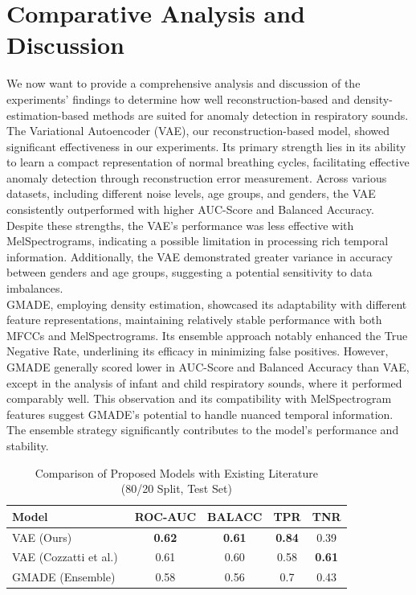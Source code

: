 \section{Comparative Analysis and Discussion}
We now want to provide a comprehensive analysis and discussion of the experiments' findings to determine how well reconstruction-based and density-estimation-based methods are suited for anomaly detection in respiratory sounds.
The Variational Autoencoder (VAE), our reconstruction-based model, showed significant effectiveness in our experiments. Its primary strength lies in its ability to learn a compact representation of normal breathing cycles, facilitating effective anomaly detection through reconstruction error measurement. Across various datasets, including different noise levels, age groups, and genders, the VAE consistently outperformed with higher AUC-Score and Balanced Accuracy.\\
Despite these strengths, the VAE's performance was less effective with MelSpectrograms, indicating a possible limitation in processing rich temporal information. Additionally, the VAE demonstrated greater variance in accuracy between genders and age groups, suggesting a potential sensitivity to data imbalances.\\
GMADE, employing density estimation, showcased its adaptability with different feature representations, maintaining relatively stable performance with both MFCCs and MelSpectrograms. Its ensemble approach notably enhanced the True Negative Rate, underlining its efficacy in minimizing false positives. However, GMADE generally scored lower in AUC-Score and Balanced Accuracy than VAE, except in the analysis of infant and child respiratory sounds, where it performed comparably well. This observation and its compatibility with MelSpectrogram features suggest GMADE's potential to handle nuanced temporal information. The ensemble strategy significantly contributes to the model's performance and stability.\\

\begin{table}[h!]
    \centering
    \caption{Comparison of Proposed Models with Existing Literature\\(80/20 Split, Test Set)}
    \begin{tabular}{|l|c|c|c|c|}
    \hline
    \textbf{Model} & \textbf{ROC-AUC} & \textbf{BALACC} & \textbf{TPR} & \textbf{TNR} \\
    \hline
    VAE (Ours) & \textbf{0.62} & \textbf{0.61} & \textbf{0.84} & 0.39 \\
    VAE (Cozzatti et al.)~\cite{cozzatti2022variational} & 0.61 & 0.60 & 0.58 & \textbf{0.61} \\
    GMADE (Ensemble) & 0.58 & 0.56 & 0.7 & 0.43 \\
    \hline
    \end{tabular}
\end{table}


